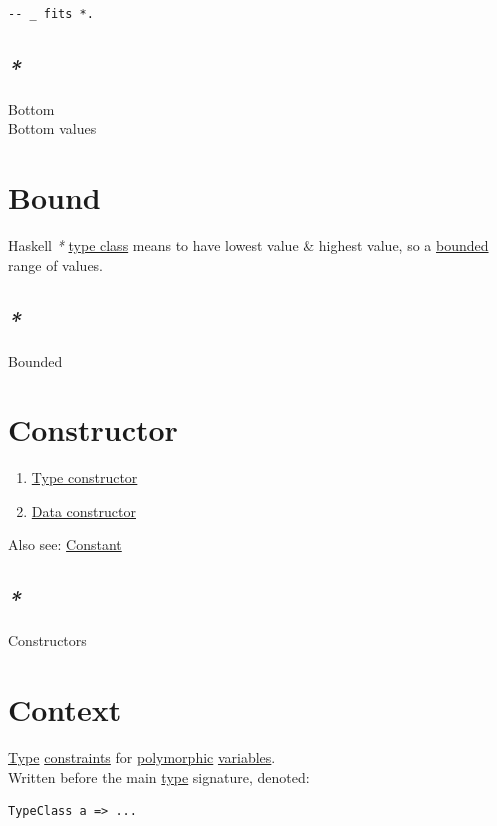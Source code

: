 \documentclass[a4paper,14pt,oneside]{book}
\begin{document}
\begin{verbatim}
-- _ fits *.
\end{verbatim}

\subsection{\emph{*}}
\label{sec:org4e404b9}

\label{orga39dca9}Bottom\\
\label{orgdee1e96}Bottom values\\

\section{\label{org060c26b}Bound}
\label{sec:org5027655}
Haskell \emph{*} \hyperref[org735fa3c]{type class} means to have lowest value \& highest value, so a \hyperref[orgb6d9ba1]{bounded} range of values.\\

\subsection{\emph{*}}
\label{sec:orgaee0543}

\label{orgb6d9ba1}Bounded\\

\section{\label{orge41bf62}Constructor}
\label{sec:org615c613}
\begin{enumerate}
\item \hyperref[org4e996fb]{Type constructor}\\
\item \hyperref[orgfbbfa22]{Data constructor}\\
\end{enumerate}

Also see: \hyperref[org378472e]{Constant}\\

\subsection{\emph{*}}
\label{sec:org41c96cf}

\label{org48436a2}Constructors\\

\section{\label{orga970b48}Context}
\label{sec:org700422f}
\hyperref[org35b9249]{Type} \hyperref[org7ed1207]{constraints} for \hyperref[orga6475c9]{polymorphic} \hyperref[org0f938c0]{variables}.\\
Written before the main \hyperref[org35b9249]{type} signature, denoted:\\
\begin{verbatim}
TypeClass a => ...
\end{verbatim}
\end{document}
